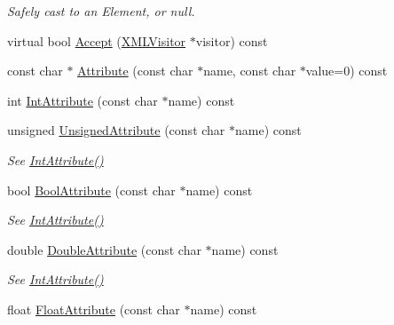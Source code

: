 \begin{DoxyCompactItemize}
\begin{DoxyCompactList}\small\item\em Safely cast to an Element, or null. \end{DoxyCompactList}\item 
virtual bool \hyperlink{classtinyxml2_1_1_x_m_l_element_a66d46e7527ec62912b49400b27137eba}{Accept} (\hyperlink{classtinyxml2_1_1_x_m_l_visitor}{X\-M\-L\-Visitor} $\ast$visitor) const 
\item 
const char $\ast$ \hyperlink{classtinyxml2_1_1_x_m_l_element_a2daabd849d6c81b7be50f456675ca38c}{Attribute} (const char $\ast$name, const char $\ast$value=0) const 
\item 
int \hyperlink{classtinyxml2_1_1_x_m_l_element_aa1e072653f4810bfad1c5a784e23c15f}{Int\-Attribute} (const char $\ast$name) const 
\item 
\hypertarget{classtinyxml2_1_1_x_m_l_element_a937ac761c7cbace1744e5f87a9573cc9}{unsigned \hyperlink{classtinyxml2_1_1_x_m_l_element_a937ac761c7cbace1744e5f87a9573cc9}{Unsigned\-Attribute} (const char $\ast$name) const }\label{classtinyxml2_1_1_x_m_l_element_a937ac761c7cbace1744e5f87a9573cc9}

\begin{DoxyCompactList}\small\item\em See \hyperlink{classtinyxml2_1_1_x_m_l_element_aa1e072653f4810bfad1c5a784e23c15f}{Int\-Attribute()} \end{DoxyCompactList}\item 
\hypertarget{classtinyxml2_1_1_x_m_l_element_a86bf47b1bf1eca1a723c0308e0ced6f0}{bool \hyperlink{classtinyxml2_1_1_x_m_l_element_a86bf47b1bf1eca1a723c0308e0ced6f0}{Bool\-Attribute} (const char $\ast$name) const }\label{classtinyxml2_1_1_x_m_l_element_a86bf47b1bf1eca1a723c0308e0ced6f0}

\begin{DoxyCompactList}\small\item\em See \hyperlink{classtinyxml2_1_1_x_m_l_element_aa1e072653f4810bfad1c5a784e23c15f}{Int\-Attribute()} \end{DoxyCompactList}\item 
\hypertarget{classtinyxml2_1_1_x_m_l_element_a55cd0cb0ec1e0739f1319e5c62eddbeb}{double \hyperlink{classtinyxml2_1_1_x_m_l_element_a55cd0cb0ec1e0739f1319e5c62eddbeb}{Double\-Attribute} (const char $\ast$name) const }\label{classtinyxml2_1_1_x_m_l_element_a55cd0cb0ec1e0739f1319e5c62eddbeb}

\begin{DoxyCompactList}\small\item\em See \hyperlink{classtinyxml2_1_1_x_m_l_element_aa1e072653f4810bfad1c5a784e23c15f}{Int\-Attribute()} \end{DoxyCompactList}\item 
\hypertarget{classtinyxml2_1_1_x_m_l_element_ad51a746a8836d643e47e15f15d3d27d2}{float \hyperlink{classtinyxml2_1_1_x_m_l_element_ad51a746a8836d643e47e15f15d3d27d2}{Float\-Attribute} (const char $\ast$name) const }\label{classtinyxml2_1_1_x_m_l_element_ad51a746a8836d643e47e15f15d3d27d2}


\end{DoxyCompactItemize}
